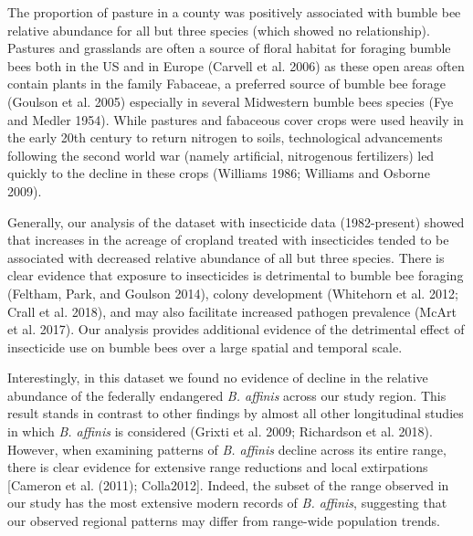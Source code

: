 \documentclass[11pt,]{article}
\begin{document}
The proportion of pasture in a county was positively associated with
bumble bee relative abundance for all but three species (which showed no
relationship). Pastures and grasslands are often a source of floral
habitat for foraging bumble bees both in the US and in Europe (Carvell
et al. 2006) as these open areas often contain plants in the family
Fabaceae, a preferred source of bumble bee forage (Goulson et al. 2005)
especially in several Midwestern bumble bees species (Fye and Medler
1954). While pastures and fabaceous cover crops were used heavily in the
early 20th century to return nitrogen to soils, technological
advancements following the second world war (namely artificial,
nitrogenous fertilizers) led quickly to the decline in these crops
(Williams 1986; Williams and Osborne 2009).

Generally, our analysis of the dataset with insecticide data
(1982-present) showed that increases in the acreage of cropland treated
with insecticides tended to be associated with decreased relative
abundance of all but three species. There is clear evidence that
exposure to insecticides is detrimental to bumble bee foraging (Feltham,
Park, and Goulson 2014), colony development (Whitehorn et al. 2012;
Crall et al. 2018), and may also facilitate increased pathogen
prevalence (McArt et al. 2017). Our analysis provides additional
evidence of the detrimental effect of insecticide use on bumble bees
over a large spatial and temporal scale.

Interestingly, in this dataset we found no evidence of decline in the
relative abundance of the federally endangered \emph{B. affinis} across
our study region. This result stands in contrast to other findings by
almost all other longitudinal studies in which \emph{B. affinis} is
considered (Grixti et al. 2009; Richardson et al. 2018). However, when
examining patterns of \emph{B. affinis} decline across its entire range,
there is clear evidence for extensive range reductions and local
extirpations {[}Cameron et al. (2011); Colla2012{]}. Indeed, the subset
of the range observed in our study has the most extensive modern records
of \emph{B. affinis}, suggesting that our observed regional patterns may
differ from range-wide population trends.
\end{document}
